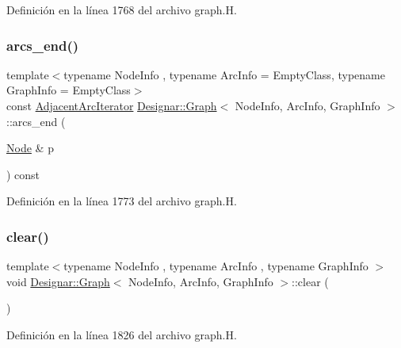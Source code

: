 Definición en la línea 1768 del archivo graph.\+H.

\mbox{\label{class_designar_1_1_graph_a305a413007d60401317366c92245bfa4}} 
\subsubsection{\texorpdfstring{arcs\+\_\+end()}{arcs\_end()}\hspace{0.1cm}{\footnotesize\ttfamily [4/4]}}
{\footnotesize\ttfamily template$<$typename Node\+Info , typename Arc\+Info  = Empty\+Class, typename Graph\+Info  = Empty\+Class$>$ \\
const \hyperlink{class_designar_1_1_graph_1_1_adjacent_arc_iterator}{Adjacent\+Arc\+Iterator} \hyperlink{class_designar_1_1_graph}{Designar\+::\+Graph}$<$ Node\+Info, Arc\+Info, Graph\+Info $>$\+::arcs\+\_\+end (\begin{DoxyParamCaption}\item[{\hyperlink{class_designar_1_1_graph_a5dfc7dba9d092ac489c72e40390c37d0}{Node} \&}]{p }\end{DoxyParamCaption}) const\hspace{0.3cm}{\ttfamily [inline]}}



Definición en la línea 1773 del archivo graph.\+H.

\mbox{\label{class_designar_1_1_graph_acfebca533d00dae0c40b0dd88f64296c}} 
\subsubsection{\texorpdfstring{clear()}{clear()}}
{\footnotesize\ttfamily template$<$typename Node\+Info , typename Arc\+Info , typename Graph\+Info $>$ \\
void \hyperlink{class_designar_1_1_graph}{Designar\+::\+Graph}$<$ Node\+Info, Arc\+Info, Graph\+Info $>$\+::clear (\begin{DoxyParamCaption}{ }\end{DoxyParamCaption})}



Definición en la línea 1826 del archivo graph.\+H.

